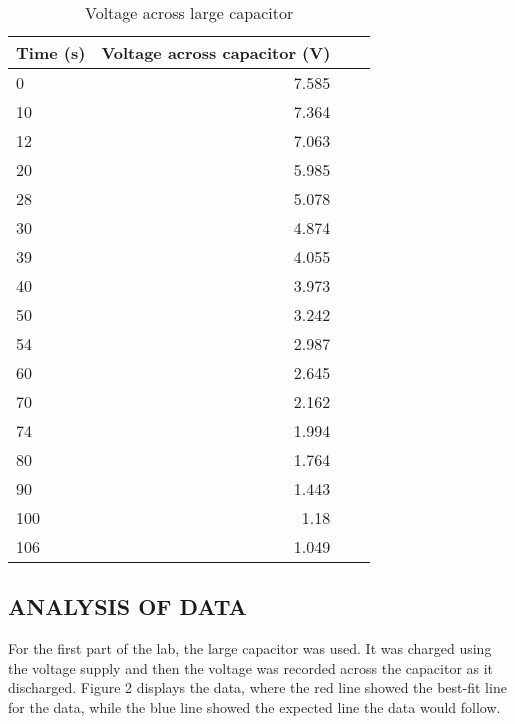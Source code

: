 \documentclass [12pt, letterpaper, twoside] {article}
\begin{document}
\begin{table}
  \centering
  \begin{tabular}{| l | r | r | r |}
    \hline\hline
    Time (s) & Voltage across capacitor (V) \\
    \hline
    0 & 7.585 \\
    \hline
    10 & 7.364 \\
    \hline
    12 & 7.063 \\
    \hline
    20 & 5.985 \\
    \hline
    28 & 5.078 \\
    \hline
    30 & 4.874 \\
    \hline
    39 & 4.055 \\
    \hline
    40 & 3.973 \\
    \hline
    50 & 3.242 \\
    \hline
    54 & 2.987 \\
    \hline
    60 & 2.645 \\
    \hline
    70 & 2.162 \\
    \hline
    74 & 1.994 \\
    \hline
    80 & 1.764 \\
    \hline
    90 & 1.443 \\
    \hline
    100 & 1.18 \\
    \hline
    106 & 1.049 \\
    \hline\hline
  \end{tabular}
  \caption{Voltage across large capacitor}
\end{table}

\subsection* {ANALYSIS OF DATA}
For the first part of the lab, the large capacitor was used. It was charged using the voltage supply and then the voltage was recorded across the capacitor as it discharged. Figure 2 displays the data, where the red line showed the best-fit line for the data, while the blue line showed the expected line the data would follow. 
\end{document}
